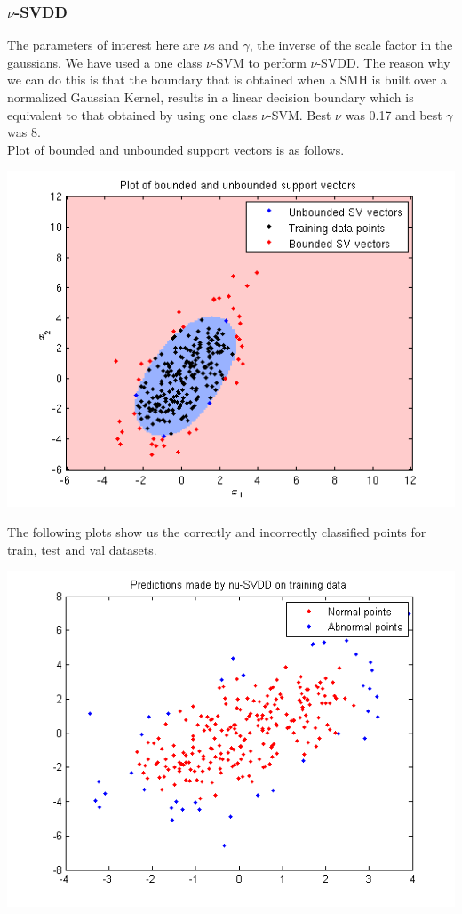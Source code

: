 \documentclass{article}
\begin{document}
\subsubsection{$\nu$-SVDD}
The parameters of interest here are $\nu$s and $\gamma$, the inverse of the scale factor in the gaussians. We have used a one class $\nu$-SVM to perform $\nu$-SVDD. The reason why we can do this is that the boundary that is obtained when a SMH is built over a normalized Gaussian Kernel, results in a linear decision boundary which is equivalent to that obtained by using one class $\nu$-SVM. Best $\nu$ was 0.17 and best $\gamma$ was 8.\\[10pt]
Plot of bounded and unbounded support vectors is as follows.
\begin{center}
\includegraphics[scale=1]{SVDD/nu/SV}
\end{center}
The following plots show us the correctly and incorrectly classified points for train, test and val datasets.
\begin{center}
\includegraphics[scale=.8]{SVDD/nu/train_plot}
\end{center}
\end{document}
